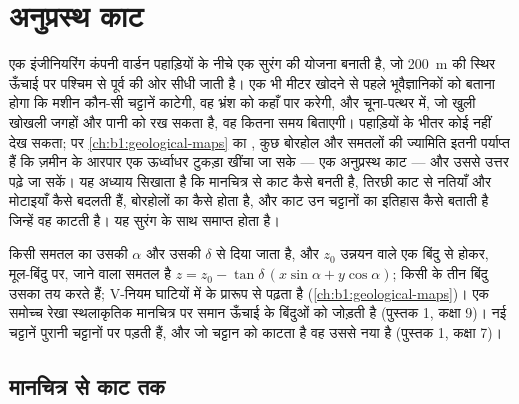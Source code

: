 \chapter{अनुप्रस्थ काट}\label{ch:b1:cross-sections}

एक इंजीनियरिंग कंपनी वार्डन पहाड़ियों के नीचे एक सुरंग की योजना बनाती है, जो \qty{200}{m} की स्थिर ऊँचाई पर
पश्चिम से पूर्व की ओर सीधी जाती है। एक भी मीटर खोदने से पहले भूवैज्ञानिकों को बताना होगा कि मशीन कौन-सी
चट्टानें काटेगी, वह भ्रंश को कहाँ पार करेगी, और चूना-पत्थर में, जो खुली खोखली जगहों और पानी को रख सकता है,
वह कितना समय बिताएगी। पहाड़ियों के भीतर कोई नहीं देख सकता; पर \cref{ch:b1:geological-maps} का , कुछ बोरहोल और समतलों की ज्यामिति इतनी पर्याप्त हैं कि ज़मीन के आरपार एक ऊर्ध्वाधर टुकड़ा खींचा
जा सके --- एक अनुप्रस्थ काट --- और उससे उत्तर पढ़े जा सकें। यह अध्याय सिखाता है कि मानचित्र से काट कैसे बनती
है, तिरछी काट से नतियाँ और मोटाइयाँ कैसे बदलती हैं, बोरहोलों का  कैसे होता है, और काट उन चट्टानों
का इतिहास कैसे बताती है जिन्हें वह काटती है। यह सुरंग के साथ समाप्त होता है।

\begin{recall}
किसी समतल का  उसकी  $\alpha$ और उसकी  $\delta$ से दिया जाता है, और $z_0$ उन्नयन वाले
एक बिंदु से होकर, मूल-बिंदु पर, जाने वाला समतल है $z = z_0 - \tan\delta\,(x\sin\alpha + y\cos\alpha)$; किसी 
के तीन बिंदु उसका  तय करते हैं; V-नियम घाटियों में  के प्रारूप से  पढ़ता है
(\cref{ch:b1:geological-maps})। एक समोच्च रेखा स्थलाकृतिक मानचित्र पर समान ऊँचाई के बिंदुओं को जोड़ती है
(पुस्तक 1, कक्षा 9)। नई चट्टानें पुरानी चट्टानों पर पड़ती हैं, और जो चट्टान को काटता है वह उससे नया है
(पुस्तक 1, कक्षा 7)।
\end{recall}

\section{मानचित्र से काट तक}

